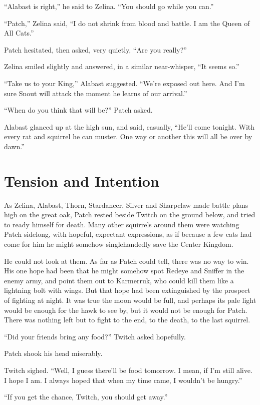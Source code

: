 \documentclass[ebook,oneside,openany,12pt]{memoir}
\begin{document}
“Alabast is right,” he said to Zelina. “You should go while you can.”

“Patch,” Zelina said, “I do not shrink from blood and battle. I am the
Queen of All Cats.”

Patch hesitated, then asked, very quietly, “Are you really?”

Zelina smiled slightly and answered, in a similar near-whisper, “It
seems so.”

“Take us to your King,” Alabast suggested. “We’re exposed out
here. And I’m sure Snout will attack the moment he learns of our
arrival.”

“When do you think that will be?” Patch asked.

Alabast glanced up at the high sun, and said, casually, “He’ll come
tonight. With every rat and squirrel he can muster. One way or another
this will all be over by dawn.”


\section{Tension and Intention}

As Zelina, Alabast, Thorn, Stardancer, Silver and Sharpclaw made
battle plans high on the great oak, Patch rested beside Twitch on the
ground below, and tried to ready himself for death. Many other
squirrels around them were watching Patch sidelong, with hopeful,
expectant expressions, as if because a few cats had come for him he
might somehow singlehandedly save the Center Kingdom.

He could not look at them. As far as Patch could tell, there was no
way to win. His one hope had been that he might somehow spot Redeye
and Sniffer in the enemy army, and point them out to Karmerruk, who
could kill them like a lightning bolt with wings. But that hope had
been extinguished by the prospect of fighting at night. It was true
the moon would be full, and perhaps its pale light would be enough for
the hawk to see by, but it would not be enough for Patch. There was
nothing left but to fight to the end, to the death, to the last
squirrel.

“Did your friends bring any food?” Twitch asked hopefully.

Patch shook his head miserably.

Twitch sighed. “Well, I guess there’ll be food tomorrow. I mean, if
I’m still alive. I hope I am. I always hoped that when my time came, I
wouldn’t be hungry.”

“If you get the chance, Twitch, you should get away.”
\end{document}
